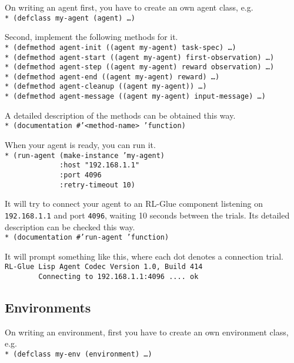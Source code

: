 \documentclass[11pt,a4paper,dvipdfm]{article}
\newcommand{\prompttext}[1]{\texttt{#1}}
\newcommand{\lispprompt}[1]{\prompttext{* #1}}
\begin{document}
On writing an agent first, you have to create an own agent class, e.g. \\
\lispprompt{(defclass my-agent (agent) \ldots)}

Second, implement the following methods for it. \\
\lispprompt{(defmethod agent-init ((agent my-agent) task-spec) \ldots)} \\
\lispprompt{(defmethod agent-start ((agent my-agent) first-observation) \ldots)} \\
\lispprompt{(defmethod agent-step ((agent my-agent) reward observation) \ldots)} \\
\lispprompt{(defmethod agent-end ((agent my-agent) reward) \ldots)} \\
\lispprompt{(defmethod agent-cleanup ((agent my-agent)) \ldots)} \\
\lispprompt{(defmethod agent-message ((agent my-agent) input-message) \ldots)}

A detailed description of the methods can be obtained this way. \\
\lispprompt{(documentation \#'<method-name> 'function)}

When your agent is ready, you can run it. \\
\lispprompt{(run-agent (make-instance 'my-agent) \\
\mbox{~~~~~~~~~~~~~}:host "192.168.1.1" \\
\mbox{~~~~~~~~~~~~~}:port 4096 \\
\mbox{~~~~~~~~~~~~~}:retry-timeout 10)}

It will try to connect your agent to an RL-Glue component listening on
\prompttext{192.168.1.1} and port \prompttext{4096}, waiting 10 seconds
between the trials. Its detailed description can be checked this way. \\
\lispprompt{(documentation \#'run-agent 'function)}

It will prompt something like this, where each dot denotes a connection
trial. \\
\prompttext{RL-Glue Lisp Agent Codec Version 1.0, Build 414} \\
\prompttext{\mbox{~~~~~~~~}Connecting to 192.168.1.1:4096 ....~ok}

\subsection{Environments}

On writing an environment, first you have to create an own environment class,
e.g. \\
\lispprompt{(defclass my-env (environment) \ldots)}
\end{document}

